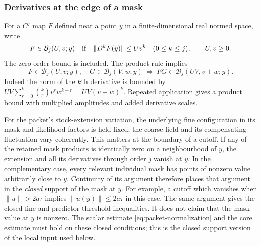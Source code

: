 \subsubsection{Derivatives at the edge of a mask}
For a $C^j$ map $F$ defined near a point $y$ in a finite-dimensional
real normed space, write
\[
 F\in\mathcal B_j(U,v;y)
 \quad\hbox{if}\quad
 \|D^kF(y)\|\le Uv^k\quad(0\le k\le j),
 \qquad U,v\ge0.
\]
The zero-order bound is included. The product rule implies
\begin{equation}\label{eq:packet-derivative-product}
 F\in\mathcal B_j(U,v;y),\quad G\in\mathcal B_j(V,w;y)
 \ \Longrightarrow\ FG\in\mathcal B_j(UV,v+w;y).
\end{equation}
Indeed the norm of the $k$th derivative is bounded by
$UV\sum_{r=0}^k\binom kr v^rw^{k-r}=UV(v+w)^k$.
Repeated application gives a product bound with multiplied amplitudes
and added derivative scales.

For the packet's stock-extension variation, the underlying fine
configuration in its mask and likelihood factors is held fixed; the coarse field and its
compensating fluctuation vary coherently. This matters at the boundary
of a cutoff. If any of the retained mask products is identically zero
on a neighbourhood of $y$, the extension and all its derivatives through
order $j$ vanish at $y$. In the complementary case, every relevant
individual mask has points of nonzero value arbitrarily close to $y$.
Continuity of its argument therefore places that argument in the
\emph{closed} support of the mask at $y$. For example, a cutoff which
vanishes when $\|u\|>2a\tau$ implies $\|u(y)\|\le2a\tau$ in this
case. The same argument gives the closed fine and predictor threshold
inequalities. It does not claim that the mask value at $y$ is nonzero.
The scalar estimate \eqref{eq:packet-normalization} and the core
estimate must hold on these closed conditions; this is the closed
support version of the local input used below.


